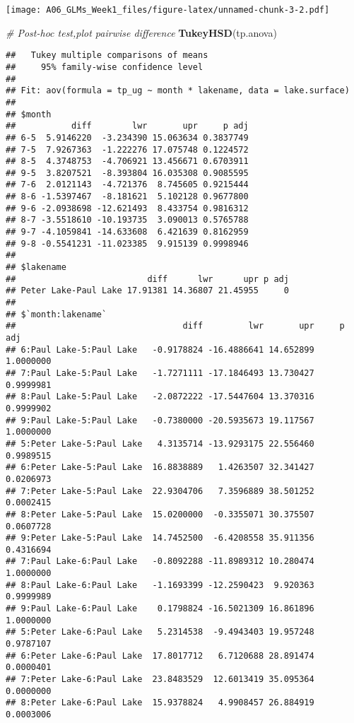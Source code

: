 \documentclass[]{article}
\newenvironment{Shaded}{\begin{snugshade}}{\end{snugshade}}
\newcommand{\CommentTok}[1]{\textcolor[rgb]{0.56,0.35,0.01}{\textit{#1}}}
\newcommand{\KeywordTok}[1]{\textcolor[rgb]{0.13,0.29,0.53}{\textbf{#1}}}
\newcommand{\NormalTok}[1]{#1}
\begin{document}
\texttt{[image: A06\_GLMs\_Week1\_files/figure-latex/unnamed-chunk-3-2.pdf]}

\begin{Shaded}
\begin{Highlighting}[]
\CommentTok{# Post-hoc test,plot pairwise difference}
\KeywordTok{TukeyHSD}\NormalTok{(tp.anova)}
\end{Highlighting}
\end{Shaded}

\begin{verbatim}
##   Tukey multiple comparisons of means
##     95% family-wise confidence level
## 
## Fit: aov(formula = tp_ug ~ month * lakename, data = lake.surface)
## 
## $month
##           diff        lwr       upr     p adj
## 6-5  5.9146220  -3.234390 15.063634 0.3837749
## 7-5  7.9267363  -1.222276 17.075748 0.1224572
## 8-5  4.3748753  -4.706921 13.456671 0.6703911
## 9-5  3.8207521  -8.393804 16.035308 0.9085595
## 7-6  2.0121143  -4.721376  8.745605 0.9215444
## 8-6 -1.5397467  -8.181621  5.102128 0.9677800
## 9-6 -2.0938698 -12.621493  8.433754 0.9816312
## 8-7 -3.5518610 -10.193735  3.090013 0.5765788
## 9-7 -4.1059841 -14.633608  6.421639 0.8162959
## 9-8 -0.5541231 -11.023385  9.915139 0.9998946
## 
## $lakename
##                          diff      lwr      upr p adj
## Peter Lake-Paul Lake 17.91381 14.36807 21.45955     0
## 
## $`month:lakename`
##                                 diff         lwr       upr     p adj
## 6:Paul Lake-5:Paul Lake   -0.9178824 -16.4886641 14.652899 1.0000000
## 7:Paul Lake-5:Paul Lake   -1.7271111 -17.1846493 13.730427 0.9999981
## 8:Paul Lake-5:Paul Lake   -2.0872222 -17.5447604 13.370316 0.9999902
## 9:Paul Lake-5:Paul Lake   -0.7380000 -20.5935673 19.117567 1.0000000
## 5:Peter Lake-5:Paul Lake   4.3135714 -13.9293175 22.556460 0.9989515
## 6:Peter Lake-5:Paul Lake  16.8838889   1.4263507 32.341427 0.0206973
## 7:Peter Lake-5:Paul Lake  22.9304706   7.3596889 38.501252 0.0002415
## 8:Peter Lake-5:Paul Lake  15.0200000  -0.3355071 30.375507 0.0607728
## 9:Peter Lake-5:Paul Lake  14.7452500  -6.4208558 35.911356 0.4316694
## 7:Paul Lake-6:Paul Lake   -0.8092288 -11.8989312 10.280474 1.0000000
## 8:Paul Lake-6:Paul Lake   -1.1693399 -12.2590423  9.920363 0.9999989
## 9:Paul Lake-6:Paul Lake    0.1798824 -16.5021309 16.861896 1.0000000
## 5:Peter Lake-6:Paul Lake   5.2314538  -9.4943403 19.957248 0.9787107
## 6:Peter Lake-6:Paul Lake  17.8017712   6.7120688 28.891474 0.0000401
## 7:Peter Lake-6:Paul Lake  23.8483529  12.6013419 35.095364 0.0000000
## 8:Peter Lake-6:Paul Lake  15.9378824   4.9908457 26.884919 0.0003006

\end{verbatim}
\end{document}
